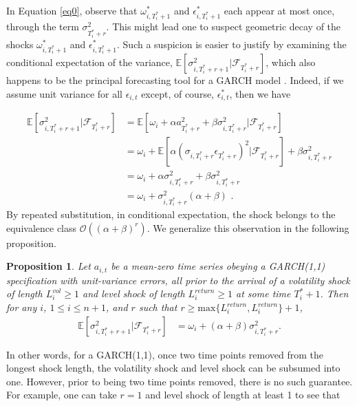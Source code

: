 \documentclass{uiucthesis2021}
\newtheorem{prop}{Proposition}
\theoremstyle{definition}
\begin{document}
In Equation \eqref{eq0}, observe that $\omega_{i,T_{i}^{*}+1}^{*}$ and $\epsilon^{*}_{i,T_{i}^{*}+1}$ 
each appear at most once, through the term $\sigma^{2}_{T_{i}^{*}+r}$.  This might lead one to 
suspect  geometric decay of the shocks $\omega_{i,T_{i}^{*}+1}^{*}$ and $\epsilon^{*}_{i,T_{i}^{*}+1}$.  
Such a suspicion is easier to justify by examining the conditional expectation of the variance, 
$\mathbb{E}[ \sigma^{2}_{i,T_{i}^{*}+r+1} |\mathcal{F}_{T_{i}^{*}+r}]$, which also happens to be the principal forecasting tool for a GARCH model \cite[][]{zivot2009practical}.  Indeed, if we assume unit variance for all $\epsilon_{i,t}$ except, of course, $\epsilon^{*}_{i,t}$, then we have

\begin{align*}
\mathbb{E}[ \sigma^{2}_{i,T_{i}^{*}+r+1} |\mathcal{F}_{T_{i}^{*}+r}] & = \mathbb{E}[\omega_{i} + \alpha a_{T_{i}^{*}+r}^{2} + \beta\sigma^{2}_{i,T_{i}^{*}+r} |\mathcal{F}_{T_{i}^{*}+r}] \\
& = \omega_{i} + \mathbb{E}[\alpha(\sigma_{i,T_{i}^{*}+r}\epsilon_{T_{i}^{*}+r})^{2} |\mathcal{F}_{T_{i}^{*}+r}] + \beta\sigma^{2}_{i,T_{i}^{*}+r} \\
& = \omega_{i} + \alpha\sigma_{i,T_{i}^{*}+r}^{2} + \beta\sigma^{2}_{i,T_{i}^{*}+r} \tag{Due to the unit variance assumption}\\
& = \omega_{i} + \sigma^{2}_{i,T_{i}^{*}+r}(\alpha + \beta) \text{ .} 
\end{align*}
By repeated substitution, in conditional expectation, the shock belongs to the equivalence class $\mathcal{O}((\alpha+\beta)^{r})$.  We generalize this observation in the following proposition.

\begin{prop}\label{decay_prop}
Let $a_{i,t}$ be a mean-zero time series obeying a GARCH(1,1) specification with unit-variance errors, all prior to the arrival of a volatility shock of length $L_{i}^{vol} \geq 1$ and level shock of length $L_{i}^{return}\geq 1$ at some time $T_{i}^{*}+1$.  Then for any $i$, $1\leq i \leq n+1$, and $r$ such that $r \geq \text{max}\{L_{i}^{return},L_{i}^{return}\} + 1$, 
\begin{align*}
\mathbb{E}[ \sigma^{2}_{i,T_{i}^{*}+r+1} |\mathcal{F}_{T_{i}^{*}+r}] & = \omega_{i} + (\alpha + \beta)\sigma^{2}_{i,T_{i}^{*}+r}.
\end{align*}
\end{prop}

In other words, for a GARCH(1,1), once two time points removed from the longest shock length, the volatility shock and level shock can be subsumed into one.  However, prior to being two time points removed, there is no such guarantee.  For example, one can take $r = 1$ and level shock of length at least 1 to see that 
\end{document}

